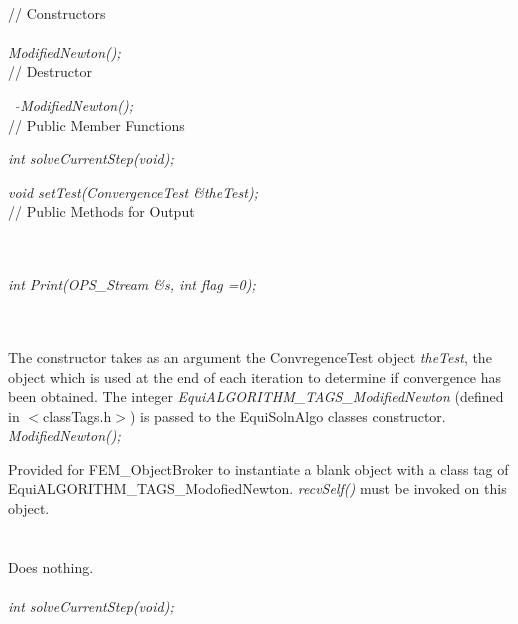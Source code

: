  \\ 
\indent // Constructors \\ 
\\ 
{\em ModifiedNewton();}\\ 

// Destructor 

{\em ~ $\tilde{}$ModifiedNewton();}\\  

// Public Member Functions 

{\em int solveCurrentStep(void);} 

{\em void setTest(ConvergenceTest \&theTest);} \\

// Public Methods  for Output 

\\ 
\\ 
{\em int Print(OPS_Stream \&s, int flag =0);} 



 \\ 
\\ 
The constructor takes as an argument the ConvregenceTest object {\em
theTest}, the object which is used at the end of each iteration to
determine if convergence has been obtained. The
integer {\em EquiALGORITHM\_TAGS\_ModifiedNewton} (defined in
$<$classTags.h$>$) is passed to the EquiSolnAlgo classes
constructor. \\ 

{\em ModifiedNewton();}

Provided for FEM\_ObjectBroker to instantiate a blank object with a
class tag of EquiALGORITHM\_TAGS\_ModofiedNewton. {\em
recvSelf()} must be invoked on this object. \\

 \\
\\ 
Does nothing. \\

  \\
{\em int solveCurrentStep(void);} 


